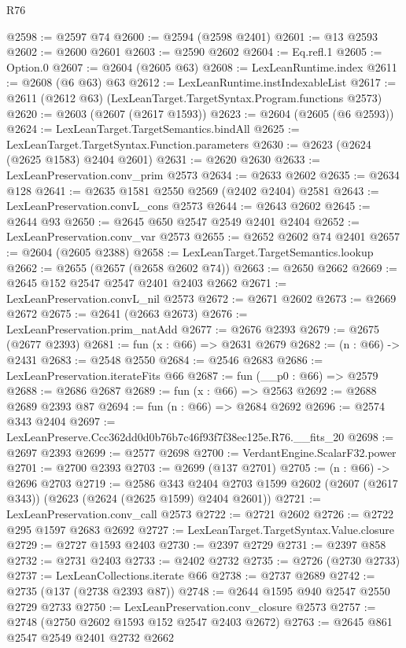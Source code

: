 \begin{lexlean}{R76}
\begin{coremodule}
@2598 := @2597 @74
@2600 := @2594 (@2598 @2401)
@2601 := @13 @2593
@2602 := @2600 @2601
@2603 := @2590 @2602
@2604 := Eq.refl.{1}
@2605 := Option.{0}
@2607 := @2604 (@2605 @63)
@2608 := LexLeanRuntime.index
@2611 := @2608 (@6 @63) @63
@2612 := LexLeanRuntime.instIndexableList
@2617 := @2611 (@2612 @63) (LexLeanTarget.TargetSyntax.Program.functions @2573)
@2620 := @2603 (@2607 (@2617 @1593))
@2623 := @2604 (@2605 (@6 @2593))
@2624 := LexLeanTarget.TargetSemantics.bindAll
@2625 := LexLeanTarget.TargetSyntax.Function.parameters
@2630 := @2623 (@2624 (@2625 @1583) @2404 @2601)
@2631 := @2620 @2630
@2633 := LexLeanPreservation.conv_prim @2573
@2634 := @2633 @2602
@2635 := @2634 @128
@2641 := @2635 @1581 @2550 @2569 (@2402 @2404) @2581
@2643 := LexLeanPreservation.convL_cons @2573
@2644 := @2643 @2602
@2645 := @2644 @93
@2650 := @2645 @650 @2547 @2549 @2401 @2404
@2652 := LexLeanPreservation.conv_var @2573
@2655 := @2652 @2602 @74 @2401
@2657 := @2604 (@2605 @2388)
@2658 := LexLeanTarget.TargetSemantics.lookup
@2662 := @2655 (@2657 (@2658 @2602 @74))
@2663 := @2650 @2662
@2669 := @2645 @152 @2547 @2547 @2401 @2403 @2662
@2671 := LexLeanPreservation.convL_nil @2573
@2672 := @2671 @2602
@2673 := @2669 @2672
@2675 := @2641 (@2663 @2673)
@2676 := LexLeanPreservation.prim_natAdd
@2677 := @2676 @2393
@2679 := @2675 (@2677 @2393)
@2681 := fun (x : @66) => @2631 @2679
@2682 := (n : @66) -> @2431
@2683 := @2548 @2550
@2684 := @2546 @2683
@2686 := LexLeanPreservation.iterateFits @66
@2687 := fun (__p0 : @66) => @2579
@2688 := @2686 @2687
@2689 := fun (x : @66) => @2563
@2692 := @2688 @2689 @2393 @87
@2694 := fun (n : @66) => @2684 @2692
@2696 := @2574 @343 @2404
@2697 := LexLeanPreserve.Ccc362dd0d0b76b7c46f93f7f38ec125e.R76.__fits_20
@2698 := @2697 @2393
@2699 := @2577 @2698
@2700 := VerdantEngine.ScalarF32.power
@2701 := @2700 @2393
@2703 := @2699 (@137 @2701)
@2705 := (n : @66) -> @2696 @2703
@2719 := @2586
    @343
    @2404
    @2703
    @1599
    @2602
    (@2607 (@2617 @343))
    (@2623 (@2624 (@2625 @1599) @2404 @2601))
@2721 := LexLeanPreservation.conv_call @2573
@2722 := @2721 @2602
@2726 := @2722 @295 @1597 @2683 @2692
@2727 := LexLeanTarget.TargetSyntax.Value.closure
@2729 := @2727 @1593 @2403
@2730 := @2397 @2729
@2731 := @2397 @858
@2732 := @2731 @2403
@2733 := @2402 @2732
@2735 := @2726 (@2730 @2733)
@2737 := LexLeanCollections.iterate @66
@2738 := @2737 @2689
@2742 := @2735 (@137 (@2738 @2393 @87))
@2748 := @2644 @1595 @940 @2547 @2550 @2729 @2733
@2750 := LexLeanPreservation.conv_closure @2573
@2757 := @2748 (@2750 @2602 @1593 @152 @2547 @2403 @2672)
@2763 := @2645 @861 @2547 @2549 @2401 @2732 @2662

\end{coremodule}
\end{lexlean}
